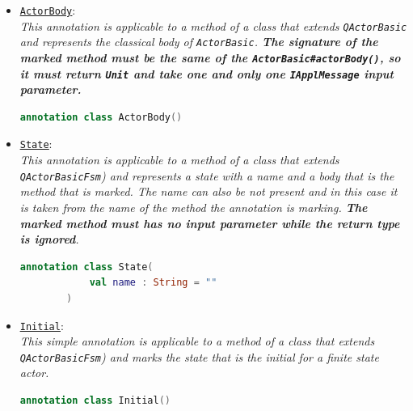 \begin{itemize}
	\item \href{https://github.com/LM-96/QA-Extensions/blob/main/it.unibo.qakactor/src/main/kotlin/annotations/ActorBody.kt}{\textcolor{YellowOrange}{\underline{\texttt{ActorBody}}}}:\\
	\textit{This annotation is applicable to a method of a class that extends \texttt{QActorBasic} and represents the classical body of \texttt{ActorBasic}. \textbf{The signature of the marked method must be the same of the \texttt{ActorBasic\#actorBody()}, so it must return \texttt{Unit} and take one and only one \texttt{IApplMessage} input parameter.}}
	\begin{lstlisting}[numbers=none,language=Kotlin]
		annotation class ActorBody()
	\end{lstlisting}
	
	\item \href{https://github.com/LM-96/QA-Extensions/blob/main/it.unibo.qakactor/src/main/kotlin/annotations/State.kt}{\textcolor{YellowOrange}{\underline{\texttt{State}}}}:\\
	\textit{This annotation is applicable to a method of a class that extends \texttt{QActorBasicFsm}) and represents a state with a name and a body that is the method that is marked. The name can also be not present and in this case it is taken from the name of the method the annotation is marking. \textbf{The marked method must has no input parameter while the return type is ignored}.}
	\begin{lstlisting}[numbers=none,language=Kotlin]
		annotation class State(
			val name : String = ""
		)
	\end{lstlisting}
	
	\item \href{https://github.com/LM-96/QA-Extensions/blob/main/it.unibo.qakactor/src/main/kotlin/annotations/State.kt}{\textcolor{YellowOrange}{\underline{\texttt{Initial}}}}:\\
	\textit{This simple annotation is applicable to a method of a class that extends \texttt{QActorBasicFsm}) and marks the state that is the initial for a finite state actor.}
	\begin{lstlisting}[numbers=none,language=Kotlin]
		annotation class Initial()
	\end{lstlisting}
	

\end{itemize}
